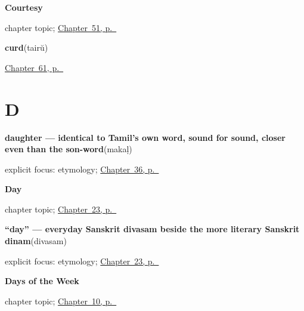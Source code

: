 \noindent\begin{minipage}[t]{\linewidth}
\raggedright
\textbf{Courtesy}\par
\footnotesize chapter topic; \hyperref[ch:ml-courtesy]{Chapter~51, p.~\pageref*{ch:ml-courtesy}}
\end{minipage}\par\smallskip

\noindent\begin{minipage}[t]{\linewidth}
\raggedright
\textbf{curd}\enspace\emph{}\enspace(tairŭ)\par
\footnotesize \hyperref[ch:ml-on-the-kitchen-shelf]{Chapter~61, p.~\pageref*{ch:ml-on-the-kitchen-shelf}}
\end{minipage}\par\smallskip

\section*{D}

\noindent\begin{minipage}[t]{\linewidth}
\raggedright
\textbf{daughter — identical to Tamil's own word, sound for sound, closer even than the son-word}\enspace\emph{}\enspace(makaḷ)\par
\footnotesize explicit focus: etymology; \hyperref[ch:ml-child-son-daughter]{Chapter~36, p.~\pageref*{ch:ml-child-son-daughter}}
\end{minipage}\par\smallskip

\noindent\begin{minipage}[t]{\linewidth}
\raggedright
\textbf{Day}\par
\footnotesize chapter topic; \hyperref[ch:ml-day]{Chapter~23, p.~\pageref*{ch:ml-day}}
\end{minipage}\par\smallskip

\noindent\begin{minipage}[t]{\linewidth}
\raggedright
\textbf{\textquotedblleft{}day\textquotedblright{} — everyday Sanskrit divasam beside the more literary Sanskrit dinam}\enspace\emph{}\enspace(divasam)\par
\footnotesize explicit focus: etymology; \hyperref[ch:ml-day]{Chapter~23, p.~\pageref*{ch:ml-day}}
\end{minipage}\par\smallskip

\noindent\begin{minipage}[t]{\linewidth}
\raggedright
\textbf{Days of the Week}\par
\footnotesize chapter topic; \hyperref[ch:ml-days-of-the-week]{Chapter~10, p.~\pageref*{ch:ml-days-of-the-week}}
\end{minipage}\par\smallskip


